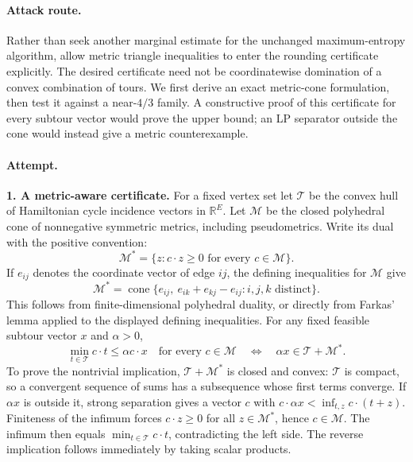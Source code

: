 \documentclass[11pt,a4paper]{article}
\newcommand{\R}{\mathbb{R}}
\numberwithin{equation}{section}
\begin{document}
\paragraph{Attack route.}
Rather than seek another marginal estimate for the unchanged
maximum-entropy algorithm, allow metric triangle inequalities to enter
the rounding certificate explicitly. The desired certificate need not
be coordinatewise domination of a convex combination of tours.
We first derive an exact metric-cone formulation, then test it against
a near-$4/3$ family. A constructive proof of this certificate for every
subtour vector would prove the upper bound; an LP separator outside
the cone would instead give a metric counterexample.

\paragraph{Attempt.}
\textbf{1. A metric-aware certificate.}
For a fixed vertex set let $\mathcal T$ be the convex hull of Hamiltonian
cycle incidence vectors in $\R^E$. Let $\mathcal M$ be the closed
polyhedral cone of nonnegative symmetric metrics, including
pseudometrics. Write its dual with the positive convention:
\[
 \mathcal M^*=\{z:c\cdot z\ge0\text{ for every }c\in\mathcal M\}.
\]
If $e_{ij}$ denotes the coordinate vector of edge $ij$, the defining
inequalities for $\mathcal M$ give
\[
 \mathcal M^*=\operatorname{cone}
 \{e_{ij},\ e_{ik}+e_{kj}-e_{ij}: i,j,k\text{ distinct}\}.
\]
This follows from finite-dimensional polyhedral duality, or directly
from Farkas' lemma applied to the displayed defining inequalities.
For any fixed feasible subtour vector $x$ and $\alpha>0$,
\begin{equation}\label{eq:30006787:dual}
 \min_{t\in\mathcal T}c\cdot t\le\alpha c\cdot x
 \quad\text{for every }c\in\mathcal M
 \quad\Longleftrightarrow\quad
               \alpha x\in\mathcal T+\mathcal M^*.
\end{equation}
To prove the nontrivial implication, $\mathcal T+\mathcal M^*$ is
closed and convex: $\mathcal T$ is compact, so a convergent sequence
of sums has a subsequence whose first terms converge. If $\alpha x$
is outside it, strong separation gives a vector $c$ with
$c\cdot\alpha x<\inf_{t,z}c\cdot(t+z)$. Finiteness of the infimum
forces $c\cdot z\ge0$ for all $z\in\mathcal M^*$, hence
$c\in\mathcal M$. The infimum then equals
$\min_{t\in\mathcal T}c\cdot t$, contradicting the left side.
The reverse implication follows immediately by taking scalar products.
\end{document}
